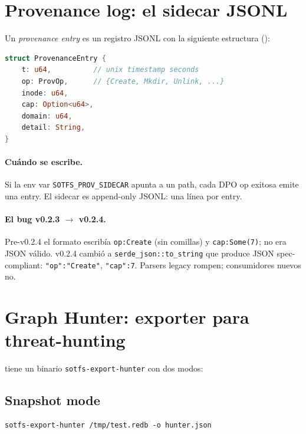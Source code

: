 \section{Provenance log: el sidecar JSONL}

\begin{defn}[ProvenanceEntry]
\label{def:prov-entry}
Un \emph{provenance entry} es un registro JSONL con la siguiente
estructura ():

\begin{lstlisting}[language=rust]
struct ProvenanceEntry {
    t: u64,          // unix timestamp seconds
    op: ProvOp,      // {Create, Mkdir, Unlink, ...}
    inode: u64,
    cap: Option<u64>,
    domain: u64,
    detail: String,
}
\end{lstlisting}
\end{defn}

\paragraph{Cuándo se escribe.} Si la env var
\texttt{SOTFS\_PROV\_SIDECAR} apunta a un path, cada DPO op exitosa
emite una entry. El sidecar es append-only JSONL: una línea por entry.

\paragraph{El bug v0.2.3 $\to$ v0.2.4.} Pre-v0.2.4 el formato escribía
\texttt{op:Create} (sin comillas) y \texttt{cap:Some(7)}; no era JSON
válido. v0.2.4 cambió a \texttt{serde\_json::to\_string} que produce
JSON spec-compliant: \texttt{"op":"Create"}, \texttt{"cap":7}.
Parsers legacy rompen; consumidores nuevos no.

\section{Graph Hunter: exporter para threat-hunting}

 tiene un binario \texttt{sotfs-export-hunter}
con dos modos:

\subsection*{Snapshot mode}

\begin{lstlisting}[language=shellcmd]
sotfs-export-hunter /tmp/test.redb -o hunter.json
\end{lstlisting}

